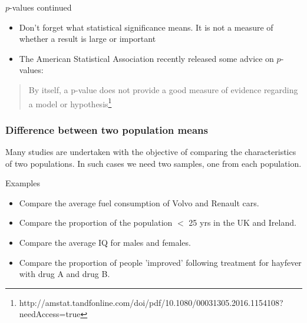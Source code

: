 \documentclass[12pt,xcolor=dvipsnames,handout,mathserif,aspectratio=169]{beamer}
\begin{document}
\begin{frame}{$p$-values continued}
\begin{itemize}
\item Don't forget what statistical significance means. It is not a measure of whether a result is large or important
\item The American Statistical Association recently released some advice on $p$-values:
\end{itemize}
\begin{quote}
By itself, a p-value does not provide a good measure of evidence regarding a model or hypothesis\footnote{http://amstat.tandfonline.com/doi/pdf/10.1080/00031305.2016.1154108?needAccess=true}
\end{quote}
\end{frame}

\begin{frame}
\frametitle{Difference between two population means}
Many studies are undertaken with the objective of comparing the characteristics of two populations. In such cases we need two samples, one from each population.

\begin{block}{Examples}
\begin{itemize}
\item Compare the average fuel consumption of Volvo and Renault cars.
\item Compare the proportion of the population $<$ 25 yrs in the UK and Ireland.
\item Compare the average IQ for males and females.
\item Compare the proportion of people 'improved' following treatment for hayfever with drug A and drug B.
\end{itemize}
\end{block}
\end{frame}
\end{document}
